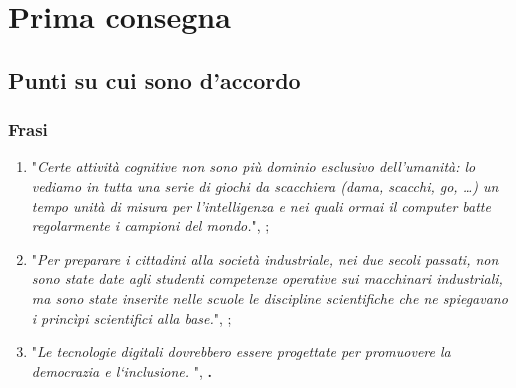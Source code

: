 \chapter{Prima consegna}

\section{Punti su cui sono d'accordo}
\subsection{Frasi}
\begin{enumerate}
    \item "\textit{Certe attività cognitive non sono più dominio esclusivo dell’umanità: lo vediamo in tutta una serie di giochi da scacchiera (dama, scacchi, go, …) un tempo unità di misura per l’intelligenza e nei quali ormai il computer batte regolarmente i campioni del mondo.}", \textbf{};  
    \item "\textit{Per preparare i cittadini alla società industriale, nei due secoli passati, non sono state date agli studenti competenze operative sui macchinari industriali, ma sono state inserite nelle scuole le discipline scientifiche che ne spiegavano i princìpi scientifici alla base.}", \textbf{};
    \item "\textit{Le tecnologie digitali dovrebbero essere progettate per promuovere la democrazia
e l‘inclusione. }", \textbf{.}
\end{enumerate}

